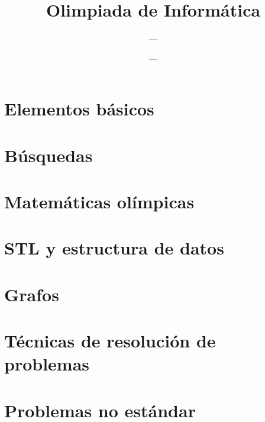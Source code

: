 \documentclass[12pt]{book}
\begin{document}
	
	
\title{Olimpiada de Informática}
\author{---}
\date{---}
\setcounter{tocdepth}{1}
\frontmatter

\maketitle
\tableofcontents

\mainmatter

\part{Elementos básicos}

\part{Búsquedas}

















\part{Matemáticas olímpicas}

\part{STL y estructura de datos}

\part{Grafos}

\part{Técnicas de resolución de problemas}

\part{Problemas no estándar}

\backmatter
\end{document}
